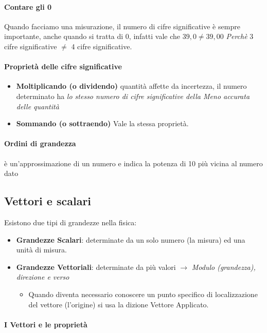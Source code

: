 \documentclass[12pt, a4paper, openany]{book}
\begin{document}
\paragraph{Contare gli 0} Quando facciamo una misurazione, il numero di cifre significative è sempre importante, anche quando si tratta di 0,
infatti vale che $39,0 \neq 39,00$ \emph{Perchè} 3 cifre significative $\neq$ 4 cifre significative.
\paragraph{Proprietà delle cifre significative}
\begin{itemize}
    \item \textbf{Moltiplicando (o dividendo)} quantità affette da incertezza, il numero determinato ha \emph{lo stesso numero di cifre significative della Meno accurata delle quantità}
    \item \textbf{Sommando (o sottraendo)} Vale la stessa proprietà.
\end{itemize}



\paragraph{Ordini di grandezza}
è un'approssimazione di un numero e indica la potenza di 10 più vicina al numero dato

\subsection{Vettori e scalari} Esistono due tipi di grandezze nella fisica:
\begin{itemize}
    \item \textbf{Grandezze Scalari}: determinate da un solo numero (la misura) ed una unità di misura.
    \item \textbf{Grandezze Vettoriali}: determinate da più valori $\to$ \emph{Modulo (grandezza), direzione e verso}
          \begin{itemize}
              \item Quando diventa necessario conoscere un punto specifico di localizzazione del vettore (l'origine) si usa la dizione Vettore Applicato.
          \end{itemize}
\end{itemize}
\paragraph{I Vettori e le proprietà}
\end{document}
